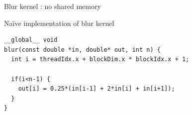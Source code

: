 \begin{frame}[fragile]{Blur kernel : no shared memory}
    \begin{code}{Na\"ive implementation of blur kernel}
        \begin{lstlisting}[style=boxcudatiny]
__global__ void
blur(const double *in, double* out, int n) {
  int i = threadIdx.x + blockDim.x * blockIdx.x + 1;

  if(i<n-1) {
    out[i] = 0.25*(in[i-1] + 2*in[i] + in[i+1]);
  }
}
        \end{lstlisting}
    \end{code}

\end{frame}
